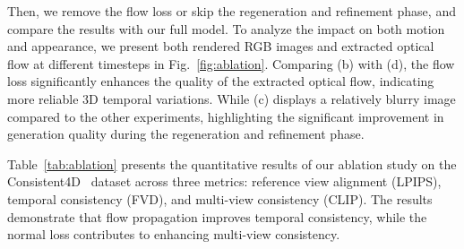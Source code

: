 \begin{figure}[h]
\begin{floatrow}

\capbtabbox{%
  \begin{tabular}{lccc}
    \toprule
     & LPIPS $\downarrow$ &  FVD $\downarrow$  & CLIP $\uparrow$    \\
    \midrule
    w/o Enlarged SA & 0.0425 & 348.36  & 0.881 \\
    w/o Flow & 0.0408 & 341.50 & 0.887 \\
    w/o Noraml  & \textbf{0.0405} & 320.93 & 0.885  \\
    Full & 0.0423 &  \textbf{313.47} & \textbf{0.891}  \\
    \bottomrule
    \end{tabular}%
}{%
  \caption{Ablation study on different components in the Consistent4D Dataset.}%
    \label{tab:ablation}
}


\end{floatrow}
\end{figure}


Then, we remove the flow loss or skip the regeneration and refinement phase, and compare the results with our full model. To analyze the impact on both motion and appearance, we present both rendered RGB images and extracted optical flow at different timesteps in Fig.~\ref{fig:ablation}. Comparing (b) with (d), the flow loss significantly enhances the quality of the extracted optical flow, indicating more reliable 3D temporal variations. While (c) displays a relatively blurry image compared to the other experiments, highlighting the significant improvement in generation quality during the regeneration and refinement phase.

Table~\ref{tab:ablation} presents the quantitative results of our ablation study on the Consistent4D~\cite{jiang2023consistent4d} dataset across three metrics: reference view alignment (LPIPS), temporal consistency (FVD), and multi-view consistency (CLIP). The results demonstrate that flow propagation improves temporal consistency, while the normal loss contributes to enhancing multi-view consistency.




